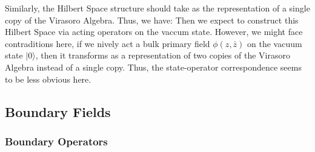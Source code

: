 Similarly, the Hilbert Space structure should take as the representation of a single copy of the Virasoro Algebra. Thus, we have:
Then we expect to construct this Hilbert Space via acting operators on the vaccum state. However, we might face contraditions here, if we nively act a bulk primary field $ \phi(z,\bar{z}) $ on the vacuum state $ |0\rangle $, then it transforms as a representation of two copies of the Virasoro Algebra instead of a single copy. Thus, the state-operator correspondence seems to be less obvious here.


\subsection{Boundary Fields}

\subsubsection{Boundary Operators}

